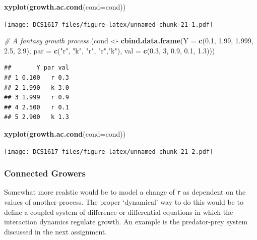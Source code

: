 \documentclass[]{book}
\newenvironment{Shaded}{\begin{snugshade}}{\end{snugshade}}
\newcommand{\KeywordTok}[1]{\textcolor[rgb]{0.13,0.29,0.53}{\textbf{{#1}}}}
\newcommand{\DataTypeTok}[1]{\textcolor[rgb]{0.13,0.29,0.53}{{#1}}}
\newcommand{\DecValTok}[1]{\textcolor[rgb]{0.00,0.00,0.81}{{#1}}}
\newcommand{\FloatTok}[1]{\textcolor[rgb]{0.00,0.00,0.81}{{#1}}}
\newcommand{\StringTok}[1]{\textcolor[rgb]{0.31,0.60,0.02}{{#1}}}
\newcommand{\CommentTok}[1]{\textcolor[rgb]{0.56,0.35,0.01}{\textit{{#1}}}}
\newcommand{\NormalTok}[1]{{#1}}
\begin{document}
\begin{Shaded}
\begin{Highlighting}[]
\KeywordTok{xyplot}\NormalTok{(}\KeywordTok{growth.ac.cond}\NormalTok{(}\DataTypeTok{cond=}\NormalTok{cond))}
\end{Highlighting}
\end{Shaded}

\texttt{[image: DCS1617\_files/figure-latex/unnamed-chunk-21-1.pdf]}

\begin{Shaded}
\begin{Highlighting}[]
\CommentTok{# A fantasy growth process}
\NormalTok{(cond <-}\StringTok{ }\KeywordTok{cbind.data.frame}\NormalTok{(}\DataTypeTok{Y =} \KeywordTok{c}\NormalTok{(}\FloatTok{0.1}\NormalTok{, }\FloatTok{1.99}\NormalTok{, }\FloatTok{1.999}\NormalTok{, }\FloatTok{2.5}\NormalTok{, }\FloatTok{2.9}\NormalTok{), }\DataTypeTok{par =} \KeywordTok{c}\NormalTok{(}\StringTok{"r"}\NormalTok{, }\StringTok{"k"}\NormalTok{, }\StringTok{"r"}\NormalTok{, }\StringTok{"r"}\NormalTok{,}\StringTok{"k"}\NormalTok{), }\DataTypeTok{val =} \KeywordTok{c}\NormalTok{(}\FloatTok{0.3}\NormalTok{, }\DecValTok{3}\NormalTok{, }\FloatTok{0.9}\NormalTok{, }\FloatTok{0.1}\NormalTok{, }\FloatTok{1.3}\NormalTok{)))}
\end{Highlighting}
\end{Shaded}

\begin{verbatim}
##       Y par val
## 1 0.100   r 0.3
## 2 1.990   k 3.0
## 3 1.999   r 0.9
## 4 2.500   r 0.1
## 5 2.900   k 1.3
\end{verbatim}

\begin{Shaded}
\begin{Highlighting}[]
\KeywordTok{xyplot}\NormalTok{(}\KeywordTok{growth.ac.cond}\NormalTok{(}\DataTypeTok{cond=}\NormalTok{cond))}
\end{Highlighting}
\end{Shaded}

\texttt{[image: DCS1617\_files/figure-latex/unnamed-chunk-21-2.pdf]}

\subsubsection*{Connected Growers}\label{connected-growers-1}

Somewhat more realstic would be to model a change of \texttt{r} as
dependent on the values of another process. The proper `dynamical' way
to do this would be to define a coupled system of difference or
differential equations in which the interaction dynamics regulate
growth. An example is the predator-prey system discussed in the next
assignment.
\end{document}
